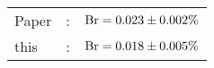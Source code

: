       \begin{tabular}{lcr}
          Paper &:& $\mathrm{Br}  = 0.023\pm 0.002\%$ \\
          this      &:& $\mathrm{Br}  = 0.018\pm 0.005\%$ \\        
      \end{tabular}
